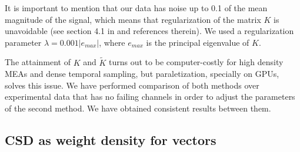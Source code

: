 \documentclass{article}
\begin{document}
It is important to mention that our data has noise up to 0.1 of the mean magnitude of the
signal, which means that regularization of the matrix $K$ is unavoidable (see section 4.1 in \cite{Potworowski2011} and references therein). We used a regularization parameter $\lambda=0.001 |e_{max}|$, where $e_{max}$ is the principal eigenvalue of $K$. 

The attainment of $K$ and $\tilde{K}$ turns out to be computer-costly for high density MEAs and dense temporal sampling, but paraletization, specially on
GPUs, solves this issue.
We have performed comparison of both methods over experimental data that has
no failing channels in order to adjust the parameters of the second method. We
have obtained consistent results between them.


\subsection{CSD as weight density for vectors}
\end{document}

